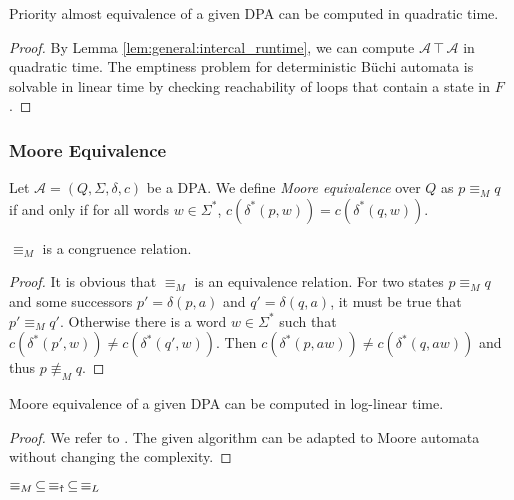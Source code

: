 \begin{cor}
	Priority almost equivalence of a given DPA can be computed in quadratic time.
\end{cor}

\begin{proof}
	By Lemma \ref{lem:general:intercal_runtime}, we can compute $\mathcal{A} \intercal \mathcal{A}$ in quadratic time. The emptiness problem for deterministic B\"uchi automata is solvable in linear time by checking reachability of loops that contain a state in $F$. 
\end{proof}


\subsubsection{Moore Equivalence}

\begin{defn}
	Let $\mathcal{A} = (Q, \Sigma, \delta, c)$ be a DPA. We define \emph{Moore equivalence} over $Q$ as $p \equiv_M q$ if and only if for all words $w \in \Sigma^*$, $c(\delta^*(p, w)) = c(\delta^*(q, w))$.
\end{defn}

\begin{lem}
	$\equiv_M$ is a congruence relation.
\end{lem}

\begin{proof}
	It is obvious that $\equiv_M$ is an equivalence relation. For two states $p \equiv_M q$ and some successors $p' = \delta(p, a)$ and $q' = \delta(q, a)$, it must be true that $p' \equiv_M q'$. Otherwise there is a word $w \in \Sigma^*$ such that $c(\delta^*(p', w)) \neq c(\delta^*(q', w))$. Then $c(\delta^*(p, aw)) \neq c(\delta^*(q, aw))$ and thus $p \not\equiv_M q$.
\end{proof}

\begin{lem}
	Moore equivalence of a given DPA can be computed in log-linear time.
\end{lem}

\begin{proof}
	We refer to \cite{Hopcroft1971}. The given algorithm can be adapted to Moore automata without changing the complexity.
\end{proof}


\vspace{10pt}

\begin{lem}
	$\equiv_M \,\subseteq\, \equiv_\text{\Ankh} \,\subseteq\, \equiv_L$
\end{lem}

